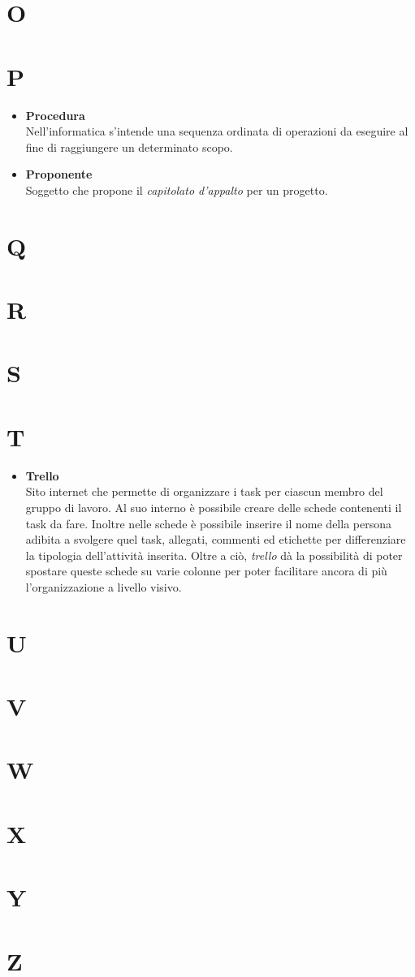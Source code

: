 \chapter{O}
\chapter{P}
	\begin{itemize}
		\item \textbf{Procedura}\\
		Nell'informatica s'intende una sequenza ordinata di operazioni da eseguire al fine di raggiungere un determinato scopo.
		
		\item \textbf{Proponente}\\
		Soggetto che propone il \textit{capitolato d'appalto} per un progetto.
	\end{itemize}
\chapter{Q}
\chapter{R}
\chapter{S}
\chapter{T}
	\begin{itemize}
		\item \textbf{Trello}\\
		Sito internet che permette di organizzare i task per ciascun membro del gruppo di lavoro.
		Al suo interno è possibile creare delle schede contenenti il task da fare.
		Inoltre nelle schede è possibile inserire il nome della persona adibita a svolgere quel task, allegati, commenti ed etichette per differenziare la tipologia dell'attività inserita.
		Oltre a ciò, \textit{trello} dà la possibilità di poter spostare queste schede su varie colonne per poter facilitare ancora di più l'organizzazione a livello visivo.
	\end{itemize}
\chapter{U}
\chapter{V}
\chapter{W}
\chapter{X}
\chapter{Y}
\chapter{Z}




